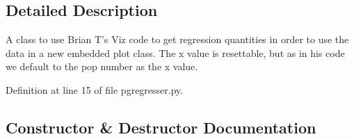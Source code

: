 \subsection{Detailed Description}
\begin{DoxyVerb}A class to use  Brian T's Viz code to get regression 
quantities in order to use the data in a new embedded 
plot class.  The x value is resettable, but as in his 
code we default to the pop number as the x value.
\end{DoxyVerb}
 

Definition at line 15 of file pgregresser.\+py.



\subsection{Constructor \& Destructor Documentation}
